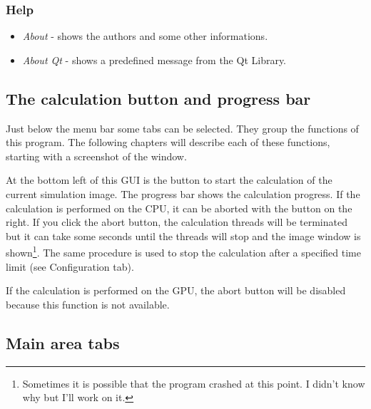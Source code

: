 \documentclass[11pt]{article} %
\begin{document}
\subsubsection{Help}

\begin{itemize}\itemsep0pt
\item {\it About} - shows the authors and some other informations.
\item {\it About Qt} - shows a predefined message from the Qt Library.
\end{itemize}


\subsection{The calculation button and progress bar}

Just below the menu bar some tabs can be selected. They group the functions of this program. The following chapters will describe each of these functions, starting with a screenshot of the window.

At the bottom left of this GUI is the button to start the calculation of the current simulation image. The progress bar shows the calculation progress. If the calculation is performed on the CPU, it can be aborted with the button on the right. If you click the abort button, the calculation threads will be terminated but it can take some seconds until the threads will stop and the image window is shown\footnote{Sometimes it is possible that the program crashed at this point. I didn't know why but I'll work on it.}. The same procedure is used to stop the calculation after a specified time limit (see Configuration tab).

If the calculation is performed on the GPU, the abort button will be disabled because this function is not available.


\clearpage
\subsection{Main area tabs}
\end{document}
